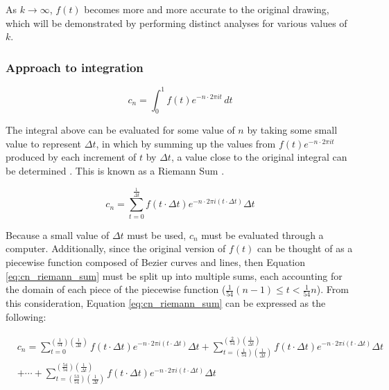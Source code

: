 \documentclass[letterpaper, 12pt]{article}
\begin{document}
As \(k \to \infty\), \(f(t)\) becomes more and more accurate to
the original drawing, which will be demonstrated by performing distinct
analyses for various values of \(k\).

\subsubsection{Approach to integration} \label{sec:approachInteg}

\begin{equation*}
    c_n = \int_{0}^{1} f(t) e^{-n \cdot 2\pi it} \,dt
\end{equation*}

The integral above can be evaluated for some value of \(n\) by
taking some small value to represent \(\Delta t\), in which
by summing up the values from \(f(t) e^{-n \cdot 2\pi it}\)
produced by each increment of \(t\) by \(\Delta t\), a value close
to the original integral can be determined \cite{sandersonWhatFourierSeries2019}.
This is known as a Riemann Sum \cite{RiemannSum2023}.

\begin{equation}
    c_n = \sum_{t = 0}^{\frac{1}{\Delta t}} f(t \cdot \Delta t) e^{-n \cdot 2\pi i(t \cdot \Delta t)} \Delta t
    \label{eq:cn_riemann_sum}
\end{equation}

Because a small value of \(\Delta t\) must be used, \(c_n\) must
be evaluated through a computer. Additionally, since the original
version of \(f(t)\) can be thought of as a piecewise function composed
of Bezier curves and lines, then Equation \ref*{eq:cn_riemann_sum}
must be split up into multiple sums, each accounting for the domain
of each piece of the piecewise function (\(\frac{1}{54}(n-1) \le t < \frac{1}{54}n\)).
From this consideration, Equation \ref*{eq:cn_riemann_sum} can be
expressed as the following:

\begin{equation}
    \begin{aligned} \label{eq:riemann_Expanded}
         & c_n = \sum_{t = 0}^{(\frac{1}{54})(\frac{1}{\Delta t})} f(t \cdot \Delta t) e^{-n \cdot 2\pi i(t \cdot \Delta t)} \Delta t
        + \sum_{t = (\frac{1}{54})(\frac{1}{\Delta t})}^{(\frac{2}{54})(\frac{1}{\Delta t})} f(t \cdot \Delta t) e^{-n \cdot 2\pi i(t \cdot \Delta t)} \Delta t
        \\
         & + \cdots
        + \sum_{t = (\frac{53}{54})(\frac{1}{\Delta t})}^{(\frac{54}{54})(\frac{1}{\Delta t})} f(t \cdot \Delta t) e^{-n \cdot 2\pi i(t \cdot \Delta t)} \Delta t
    \end{aligned}
\end{equation}
\end{document}
